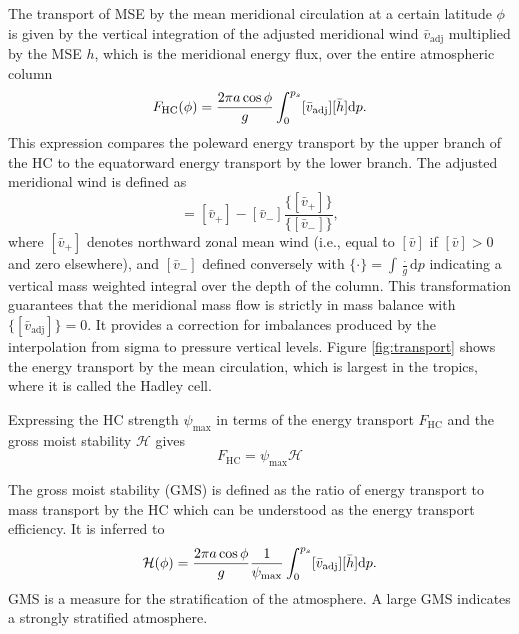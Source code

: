 The transport of MSE by the mean meridional circulation at a certain latitude $\phi$ is given by the vertical integration of the adjusted meridional wind $\bar{v}_\mathrm{adj}$ multiplied by the MSE $h$, which is the meridional energy flux, over the entire atmospheric column
\begin{equation}\label{eq:F_HC}
    F_\mathrm{HC}(\phi)=\frac{2\pi a\cos\phi}{g}\int^{p_s}_0[\Bar{v}_\mathrm{adj}][\Bar{h}]\mathrm{d}p.
\end{equation}
This expression compares the poleward energy transport by the upper branch of the HC to the equatorward energy transport by the lower branch. The adjusted meridional wind is defined as 
\begin{equation}
    [\bar{v}_\mathrm{adj}] = [\bar{v}_{+}]-[\bar{v}_{-}]\frac{\{[\bar{v}_{+}]\}}{\{[\bar{v}_{-}]\}},
\end{equation}
where $[\bar{v}_{+}]$ denotes northward zonal mean wind (i.e., equal to $[\bar{v}]$ if $[\bar{v}]>0$ and zero elsewhere), and $[\bar{v}_{-}]$ defined conversely with $\{\cdot\}=\int\frac{\cdot}{g}\mathrm{d}p$ indicating a vertical mass weighted integral over the depth of the column. This transformation guarantees that the meridional mass flow is strictly in mass balance with $\{[\bar{v}_\mathrm{adj}]\}=0$. It provides a correction for imbalances produced by the interpolation from sigma to pressure vertical levels. Figure \ref{fig:transport} shows the energy transport by the mean circulation, which is largest in the tropics, where it is called the Hadley cell.




Expressing the HC strength $\psi_\mathrm{max}$ in terms of the energy transport $F_\mathrm{HC}$ and the gross moist stability $\mathcal{H}$ gives
\begin{equation}
    \label{eq:F_psi_H}
    F_\mathrm{HC}=\psi_\mathrm{max}\mathcal{H}
\end{equation}



The gross moist stability (GMS) is defined as the ratio of energy transport to mass transport by the HC which can be understood as the energy transport efficiency. It is inferred to
\begin{equation}\label{eq:GMS}
    \mathcal{H} (\phi)=\frac{2\pi a\cos\phi}{g}\frac{1}{\psi_\mathrm{max}}\int^{p_s}_0[\Bar{v}_\mathrm{adj}][\Bar{h}]\mathrm{d}p.
\end{equation}
GMS is a measure for the stratification of the atmosphere. A large GMS indicates a strongly stratified atmosphere.

